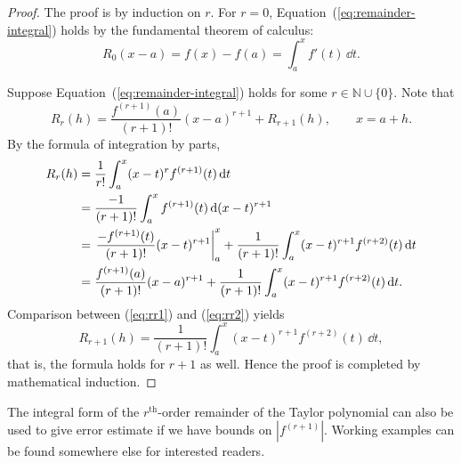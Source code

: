 \begin{proof}
  The proof is by induction on $r$.
  For $r = 0$, Equation~(\ref{eq:remainder-integral}) holds by the fundamental theorem of calculus:
  \[
    R_0(x-a) = f(x) - f(a) = \int_a^x f'(t) \, \dd t.
  \]
  
  Suppose Equation~(\ref{eq:remainder-integral}) holds for some $r \in \mathbb{N} \cup \{ 0 \}$.  Note that 
  \begin{equation}
    \label{eq:rr1}
    R_r(h) = \frac{ f^{(r+1)}(a) }{ (r+1)! } (x-a)^{r+1} + R_{r+1}(h), \qquad x = a + h.
  \end{equation}
  By the formula of integration by parts,
  \begin{align}
    R_r(h) &= \frac{1}{r!} \int_a^x (x-t)^r f^{(r+1)}(t) \, \mathrm d t \notag \\
    &= \frac{-1}{(r+1)!} \int_a^x f^{(r+1)}(t) \, \mathrm d (x-t)^{r+1} \notag \\
    &= \left. \frac{-f^{(r+1)}(t)}{(r+1)!} (x-t)^{r+1} \right|_a^x + \frac{1}{(r+1)!} \int_a^x (x-t)^{r+1} f^{(r+2)}(t) \, \mathrm d t \notag \\
      &= \frac{ f^{(r+1)}(a) }{(r+1)!} (x-a)^{r+1} + \frac{1}{(r+1)!} \int_a^x (x-t)^{r+1} f^{(r+2)}(t) \, \mathrm d t. \label{eq:rr2}
  \end{align}
  Comparison between (\ref{eq:rr1}) and (\ref{eq:rr2}) yields
  \[
    R_{r+1}(h) = \frac{1}{(r+1)!} \int_a^x (x-t)^{r+1} f^{(r+2)}(t) \, \dd t,
  \]
  that is, the formula holds for $r+1$ as well.
  Hence the proof is completed by mathematical induction.
\end{proof}

The integral form of the $r^{\text{th}}$-order remainder of the Taylor polynomial can also be used to give error estimate if we have bounds on $|f^{(r+1)}|$.
Working examples can be found somewhere else for interested readers.
